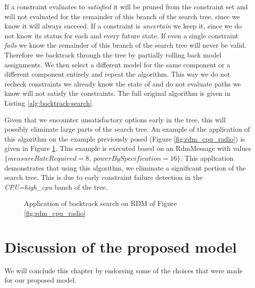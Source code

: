 If a constraint evaluates to \emph{satisfied} it will be pruned from the constraint set and will not evaluated for the remainder of this branch of the search tree, since we know it will always succeed. If a constraint is \emph{uncertain} we keep it, since we do not know its status for each and every future state. If even a single constraint \emph{fails} we know the remainder of this branch of the search tree will never be valid. Therefore we backtrack through the tree by partially rolling back model assignments. We then select a different model for the same component or a different component entirely and repeat the algorithm. This way we do not recheck constraints we already know the state of and do not evaluate paths we know will not satisfy the constraints. The full original algorithm is given in Listing \ref{alg:backtrack-search}. 

Given that we encounter unsatisfactory options early in the tree, this will possibly eliminate large parts of the search tree. An example of the application of this algorithm on the example previously posed (Figure \ref{fig:rdm_cpu_radio}) is given in Figure \ref{fig:search_cpu_radio}. This example is executed based on an RdmMessage with values $\{measureRateRequired=8,\ powerBySpecification=16\}$. This application demonstrates that using this algorithm, we eliminate a significant portion of the search tree. This is due to early constraint failure detection in the \emph{CPU=high\_cpu} banch of the tree.




\begin{figure}

\caption{Application of backtrack search on RDM of Figure \ref{fig:rdm_cpu_radio}}
\label{fig:search_cpu_radio}
\end{figure}


\section{Discussion of the proposed model}
We will conclude this chapter by endorsing some of the choices that were made for our proposed model. 
